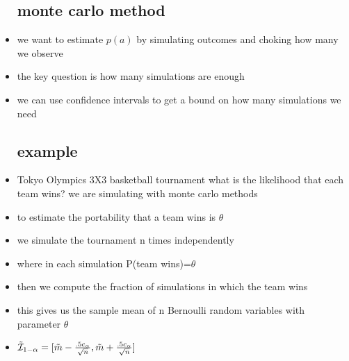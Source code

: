 \documentclass{article}
\begin{document}
\begin{itemize}
\subsection{monte carlo method}
\item we want to estimate $p(a)$ by simulating outcomes and choking how many we observe
\item the key question is how many simulations are enough 
\item we can use confidence intervals to get a bound on how many simulations we need 
\subsection{example}
\item Tokyo Olympics 3X3 basketball tournament what is the likelihood that each team wins? we are simulating with monte carlo methods 
\item to estimate the  portability that a team wins is $\theta$
\item we simulate the tournament n times independently 
\item where in each simulation P(team wins)=$\theta$
\item then we compute the fraction of simulations in which the team wins 
\item this gives us the sample mean of n Bernoulli random variables with parameter $\theta$
\item $\Tilde{\mathcal{I}}_{1-\alpha}=[\Tilde{m}-\frac{.5c_{\alpha}}{\sqrt{n}},\Tilde{m}+\frac{.5c_{\alpha}}{\sqrt{n}}]$ 

\end{itemize}
\end{document}
